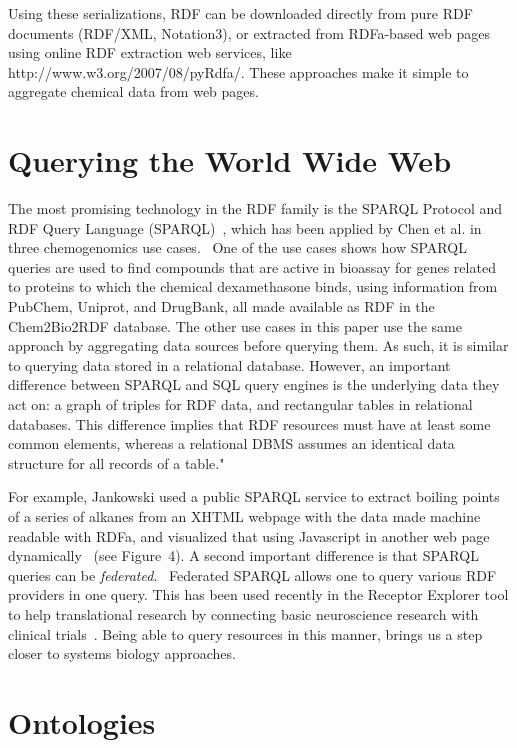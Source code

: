 \documentclass[10pt]{bmc_article}
\newenvironment{bmcformat}{\begin{raggedright}\baselineskip20pt\sloppy\setboolean{publ}{false}}{\end{raggedright}\baselineskip20pt\sloppy}
\begin{document}
\begin{bmcformat}
Using these serializations, RDF can be downloaded directly from pure RDF
documents (RDF/XML, Notation3), or extracted from RDFa-based web pages using
online RDF extraction web services, like http://www.w3.org/2007/08/pyRdfa/.
These approaches make it simple to aggregate chemical data from web pages.

\section{Querying the World Wide Web}

The most promising technology in the RDF family is the
SPARQL Protocol and RDF Query Language (SPARQL)~\cite{PrudHommeaux2008}, which has been
applied by Chen et al. in three chemogenomics use cases.~\cite{CHE2010}
One of the use cases shows how SPARQL queries are used to find compounds 
that are active in bioassay for genes related to proteins
to which the chemical dexamethasone binds, using information
from PubChem, Uniprot, and DrugBank, all made available as RDF in the Chem2Bio2RDF
database. The other use cases in this paper use the same approach
by aggregating data sources before querying them. As such, it is similar to
querying data stored in a relational database.
However, an important difference between SPARQL and SQL query engines is
the underlying data they act on: a graph of triples for RDF data, and
rectangular tables in relational databases.
This difference implies that RDF resources must have at least some
common elements,  whereas a relational DBMS assumes an identical data
structure for all records of a table."

For example, Jankowski used a public
SPARQL service to extract boiling points of a series of alkanes from an XHTML
webpage with the data made machine readable with RDFa, and visualized that using
Javascript in another web page dynamically~\cite{Jankowski2010} (see
Figure~4). A second important difference is that SPARQL queries can be
\textit{federated}.~\cite{Prudhommeaux2007Custom}
Federated SPARQL allows one to query various RDF providers in one query. This has
been used recently in the Receptor Explorer tool to help translational research
by connecting basic neuroscience research with clinical trials~\cite{Cheung2009}.
Being able to query resources in this manner, brings us a step closer to
systems biology approaches.

\section{Ontologies}


\end{bmcformat}
\end{document}
